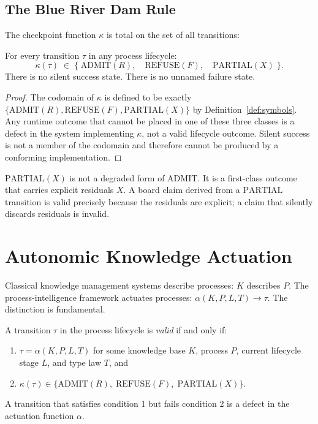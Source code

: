 \subsection{The Blue River Dam Rule}

The checkpoint function $\kappa$ is total on the set of all transitions:

\begin{theorem}
\label{thm:brd-rule}
For every transition $\tau$ in any process lifecycle:
\[
  \kappa(\tau) \;\in\;
  \{\;\mathrm{ADMIT}(R),\quad \mathrm{REFUSE}(F),\quad \mathrm{PARTIAL}(X)\;\}.
\]
There is no silent success state. There is no unnamed failure state.
\end{theorem}

\begin{proof}
The codomain of $\kappa$ is defined to be exactly
$\{\mathrm{ADMIT}(R), \mathrm{REFUSE}(F), \mathrm{PARTIAL}(X)\}$ by
Definition~\ref{def:symbols}. Any runtime outcome that cannot be placed in one
of these three classes is a defect in the system implementing $\kappa$, not a
valid lifecycle outcome. Silent success is not a member of the codomain and
therefore cannot be produced by a conforming implementation.
\end{proof}

\begin{remark}
$\mathrm{PARTIAL}(X)$ is not a degraded form of $\mathrm{ADMIT}$. It is a
first-class outcome that carries explicit residuals $X$. A board claim
derived from a $\mathrm{PARTIAL}$ transition is valid precisely because the
residuals are explicit; a claim that silently discards residuals is invalid.
\end{remark}

\section{Autonomic Knowledge Actuation}
\label{sec:pi-actuation}

Classical knowledge management systems describe processes: $K$ describes $P$.
The process-intelligence framework actuates processes: $\alpha(K, P, L, T)
\to \tau$. The distinction is fundamental.

\begin{definition}
\label{def:actuation}
A transition $\tau$ in the process lifecycle is \emph{valid} if and only if:
\begin{enumerate}
  \item $\tau = \alpha(K, P, L, T)$ for some knowledge base $K$, process $P$,
    current lifecycle stage $L$, and type law $T$, and
  \item $\kappa(\tau) \in \{\mathrm{ADMIT}(R),\; \mathrm{REFUSE}(F),\;
    \mathrm{PARTIAL}(X)\}$.
\end{enumerate}
A transition that satisfies condition 1 but fails condition 2 is a defect
in the actuation function $\alpha$.
\end{definition}

